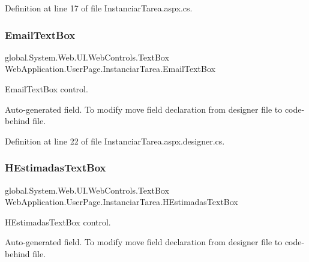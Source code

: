 Definition at line 17 of file Instanciar\+Tarea.\+aspx.\+cs.

\mbox{\label{classWebApplication_1_1UserPage_1_1InstanciarTarea_ac7c1078d8d7829f9eb3718655ef0d90f}} 
\subsubsection{\texorpdfstring{EmailTextBox}{EmailTextBox}}
{\footnotesize\ttfamily global.\+System.\+Web.\+U\+I.\+Web\+Controls.\+Text\+Box Web\+Application.\+User\+Page.\+Instanciar\+Tarea.\+Email\+Text\+Box\hspace{0.3cm}{\ttfamily [protected]}}



Email\+Text\+Box control. 

Auto-\/generated field. To modify move field declaration from designer file to code-\/behind file. 

Definition at line 22 of file Instanciar\+Tarea.\+aspx.\+designer.\+cs.

\mbox{\label{classWebApplication_1_1UserPage_1_1InstanciarTarea_aa20d337e519f4e12ca3ab1d5070fe47f}} 
\subsubsection{\texorpdfstring{HEstimadasTextBox}{HEstimadasTextBox}}
{\footnotesize\ttfamily global.\+System.\+Web.\+U\+I.\+Web\+Controls.\+Text\+Box Web\+Application.\+User\+Page.\+Instanciar\+Tarea.\+H\+Estimadas\+Text\+Box\hspace{0.3cm}{\ttfamily [protected]}}



H\+Estimadas\+Text\+Box control. 

Auto-\/generated field. To modify move field declaration from designer file to code-\/behind file. 

